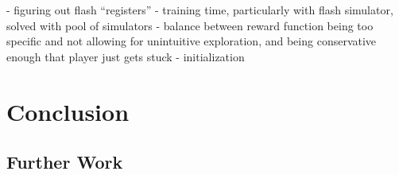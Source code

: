 \documentclass[12pt]{article}
\begin{document}
- figuring out flash ``registers''
- training time, particularly with flash simulator, solved with pool of simulators
- balance between reward function being too specific and not allowing for unintuitive exploration, and being conservative enough that player just gets stuck
- initialization

\section{Conclusion}

\subsection{Further Work}

\pagebreak
\printbibliography
\end{document}
